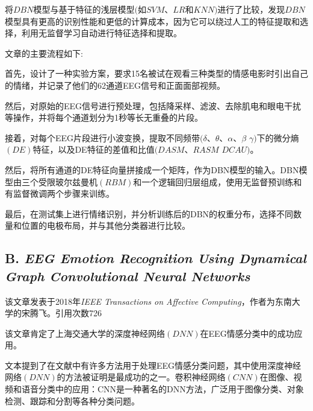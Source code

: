 \documentclass[conference]{IEEEtran}
\begin{document}
将$DBN$模型与基于特征的浅层模型$($如$SVM$、$LR$和$KNN$$)$进行了比较，发现$DBN$模型具有更高的识别性能和更低的计算成本，因为它可以绕过人工的特征提取和选择，利用无监督学习自动进行特征选择和提取。

文章的主要流程如下:

首先，设计了一种实验方案，要求15名被试在观看三种类型的情感电影时引出自己的情绪，并记录了他们的62通道EEG信号和正面面部视频。 

然后，对原始的EEG信号进行预处理，包括降采样、滤波、去除肌电和眼电干扰等操作，并将每个通道划分为1秒等长无重叠的片段。 

接着，对每个EEG片段进行小波变换，提取不同频带$(\delta$、$\theta$、$\alpha$、$\beta$  $\gamma)$下的微分熵$(DE)$特征，以及DE特征的差值和比值$(DASM$、$RASM$  $DCAU)$。

然后，将所有通道的DE特征向量拼接成一个矩阵，作为DBN模型的输入。DBN模型由三个受限玻尔兹曼机$(RBM)$和一个逻辑回归层组成，使用无监督预训练和有监督微调两个步骤来训练。 

最后，在测试集上进行情绪识别，并分析训练后的DBN的权重分布，选择不同数量和位置的电极布局，并与其他分类器进行比较。
\subsection*{B. \textit{\textbf{EEG Emotion Recognition Using Dynamical Graph Convolutional Neural Networks}}}
该文章\cite{song2018eeg}发表于2018年\textit{IEEE Transactions on Affective Computing}，作者为东南大学的宋腾飞。引用次数726

该文章肯定了上海交通大学的深度神经网络$(DNN)$在EEG情感分类中的成功应用。

文本提到了在文献中有许多方法用于处理EEG情感分类问题，其中使用深度神经网络$(DNN)$的方法被证明是最成功的之一。卷积神经网络$(CNN)$在图像、视频和语音分类中的应用：CNN是一种著名的DNN方法，广泛用于图像分类、对象检测、跟踪和分割等各种分类问题。
\end{document}
